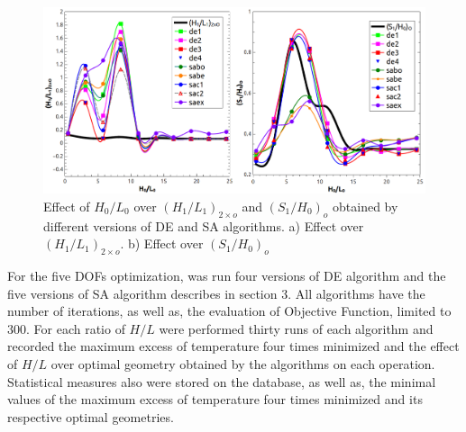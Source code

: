 \documentclass[12pt,fleqn]{article}
\begin{document}
\begin{figure}[H]
\centering
\includegraphics[width=0.9\linewidth]{imgs/4dof/de_sa_h0l0-h1l1-s1h0-4dof.png}
\caption{ {\small Effect of $H_{0}/L_{0}$ over $(H_{1}/L_{1})_{2\times o}$ and $(S_{1}/H_{0})_{o}$ obtained by different versions of DE and SA algorithms. a) Effect over $(H_{1}/L_{1})_{2\times o}$. b) Effect over $(S_{1}/H_{0})_{o}$ }}
\label{figure03}
\end{figure}
For the five DOFs optimization, was run four versions of DE algorithm and the five versions of SA algorithm describes in section 3. All algorithms have the number of iterations, as well as, the evaluation of Objective Function, limited to 300. For each ratio of $H/L$ were performed thirty runs of each algorithm and recorded the maximum excess of temperature four times minimized and the effect of $H/L$ over optimal geometry obtained by the algorithms on each operation. Statistical measures also were stored on the database, as well as, the minimal values of the maximum excess of temperature four times minimized and its respective optimal geometries.
\end{document}

